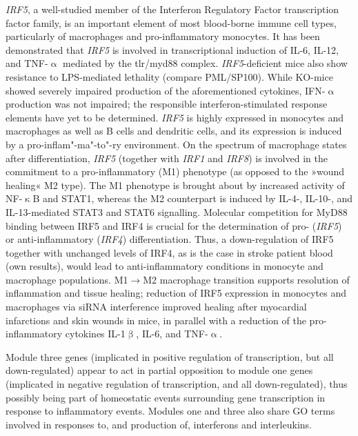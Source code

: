 \emph{IRF5}, a well-studied member of the Interferon Regulatory Factor transcription factor family, is an important element of most blood-borne immune cell types, particularly of macrophages and pro-inflammatory monocytes.\cite{Li2016} It has been demonstrated that \emph{IRF5} is involved in transcriptional induction of IL-6, IL-12, and TNF-$\upalpha$ mediated by the \acf{tlr}/\ac{myd88} complex. \emph{IRF5}-deficient mice also show resistance to LPS-mediated lethality (compare PML/SP100).\cite{Takaoka2005} While KO-mice showed severely impaired production of the aforementioned cytokines, IFN-$\upalpha$ production was not impaired; the responsible interferon-stimulated response elements have yet to be determined.\cite{Takaoka2005} \emph{IRF5} is highly expressed in monocytes and macrophages as well as B cells and dendritic cells, and its expression is induced by a pro-inflam"-ma"-to"-ry environment.\cite{Krausgruber2011} On the spectrum of macrophage states after differentiation, \emph{IRF5} (together with \emph{IRF1} and \emph{IRF8}) is involved in the commitment to a pro-inflammatory (M1) phenotype (as opposed to the »wound healing« M2 type).\cite{Chistiakov2018}  The M1 phenotype is brought about by increased activity of NF-$\upkappa$B and STAT1, whereas the M2 counterpart is induced by IL-4-, IL-10-, and IL-13-mediated STAT3 and STAT6 signalling.\cite{Wang2014a} Molecular competition for MyD88 binding between IRF5 and IRF4 is crucial for the determination of pro- (\emph{IRF5}) or anti-inflammatory (\emph{IRF4}) differentiation.\cite{Negishi2006} Thus, a down-regulation of IRF5 together with unchanged levels of IRF4, as is the case in stroke patient blood (own results\cite{Winek2020}), would lead to anti-inflammatory conditions in monocyte and macrophage populations. M1$\to$M2 macrophage transition supports resolution of inflammation and tissue healing; reduction of IRF5 expression in monocytes and macrophages via siRNA interference improved healing after myocardial infarctions and skin wounds in mice, in parallel with a reduction of the pro-inflammatory cytokines IL-1$\upbeta$, IL-6, and TNF-$\upalpha$.\cite{Courties2014}

Module three genes (implicated in positive regulation of transcription, but all down-regulated) appear to act in partial opposition to module one genes (implicated in negative regulation of transcription, and all down-regulated), thus possibly being part of homeostatic events surrounding gene transcription in response to inflammatory events. Modules one and three also share GO terms involved in responses to, and production of, interferons and interleukins.

